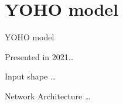 

\section[YOHO model]{YOHO model}

	\begin{frame}{YOHO model}
			
		Presented in 2021\cite{Venkatesh_2022}\dots
		
		\note{
			\dots			
		}		
		
	\end{frame}
	
	\begin{frame}{Input shape}
		\dots
		
		\note{
			\dots
		}
	\end{frame}
	
	
	\begin{frame}{Network Architecture}
		\dots
		
		\note{
			\dots
		}
	\end{frame}
	
